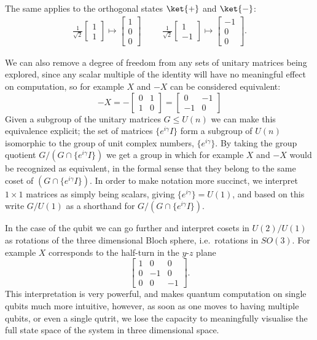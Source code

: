 The same applies to the orthogonal states $\ket{+}$ and $\ket{-}$:
\begin{align*}
	\frac{1}{\sqrt{2}}\begin{bmatrix}1 \\ 1\end{bmatrix} \mapsto \begin{bmatrix}1\\0\\0\end{bmatrix}
	&&&
	\frac{1}{\sqrt{2}}\begin{bmatrix}1 \\ -1\end{bmatrix} \mapsto \begin{bmatrix}-1\\0\\0\end{bmatrix}.
\end{align*}

We can also remove a degree of freedom from any sets of unitary matrices being explored, since any scalar multiple of the identity will have no meaningful effect on computation, so for example $X$ and $-X$ can be considered equivalent:
\[-X = -\left[\begin{matrix}0 & 1 \\ 1 & 0\end{matrix}\right]= \left[\begin{matrix}0 & -1 \\ -1 & 0\end{matrix}\right]\]
Given a subgroup of the unitary matrices $G \leq U(n)$ we can make this equivalence explicit; the set of matrices $\{e^{i\gamma}I\}$ form a subgroup of $U(n)$ isomorphic to the group of unit complex numbers, $\{e^{i\gamma}\}$. By taking the group quotient $G / (G \cap \{e^{i\gamma}I\})$ we get a group in which for example $X$ and $-X$ would be recognized as equivalent, in the formal sense that they belong to the same coset of $(G \cap \{e^{i\gamma}I\})$. In order to make notation more succinct, we interpret $1 \times 1$ matrices as simply being scalars, giving $\{e^{i\gamma}\} = U(1)$, and based on this write $G / U(1)$ as a shorthand for $G / (G \cap \{e^{i\gamma}I\})$.

In the case of the qubit we can go further and interpret cosets in $U(2)/U(1)$ as rotations of the three dimensional Bloch sphere, i.e.\ rotations in $SO(3)$. For example $X$ corresponds to the half-turn in the $y$-$z$ plane
\[\begin{bmatrix}
1 & 0 & 0 \\
0 & -1 & 0 \\
0 & 0 & -1
\end{bmatrix}.\]
This interpretation is very powerful, and makes quantum computation on single qubits much more intuitive, however, as soon as one moves to having multiple qubits, or even a single qutrit, we lose the capacity to meaningfully visualise the full state space of the system in three dimensional space.

